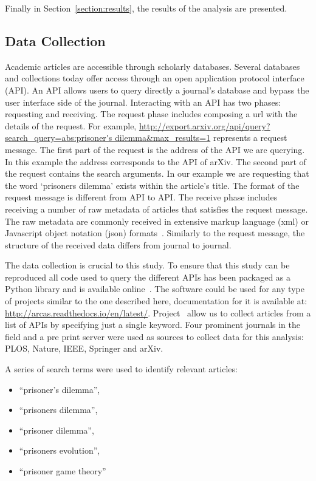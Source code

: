 \documentclass{article}
\theoremstyle{definition}
\begin{document}
Finally in Section~\ref{section:results}, the results of the analysis are presented.

\subsection{Data Collection}\label{section:data_collection}

Academic articles are accessible through scholarly databases.
Several databases and collections today offer access through
an open application protocol interface (API). An API allows users to query
directly a journal's database and bypass the user interface side of the journal.
Interacting with an API has two phases: requesting and receiving.
The request phase includes composing a url with the details of the request. For
example, \url{http://export.arxiv.org/api/query?search_query=abs:prisoner's dilemma&max_results=1}
represents a request message. The first part of the request is the address
of the API we are querying.
In this example the address corresponds to the API of arXiv.
The second part of the request contains the search arguments. In our example we
are requesting that the word `prisoners dilemma' exists within
the article's title. The format of the request message is different from API to API.
The receive phase includes receiving a number of raw metadata of articles that
satisfies the request message. The raw metadata are commonly received in extensive markup
language (xml) or Javascript object notation (json) formats~\cite{nurseitov2009}.
Similarly to the request message, the structure of the received data differs from journal
to journal.

The data collection is crucial to this study. To ensure that this study can be
reproduced all code used to query the different APIs has been packaged as a Python library and is
available online~\cite{nikoleta_2017}. The software could be used for any type of
projects similar to the one described here, documentation for it is available at:
\url{http://arcas.readthedocs.io/en/latest/}.
Project~\cite{nikoleta_2017} allow us to collect articles from a list of APIs by
specifying just a single keyword. Four prominent journals in the field and a
pre print server were used as sources to collect data for this analysis:
PLOS, Nature, IEEE, Springer and arXiv.

A series of search terms were used to identify relevant articles:

\begin{itemize}
    \item ``prisoner's dilemma'',
    \item ``prisoners dilemma'',
    \item ``prisoner dilemma'',
    \item ``prisoners evolution'',
    \item ``prisoner game theory''
\end{itemize}
\end{document}
